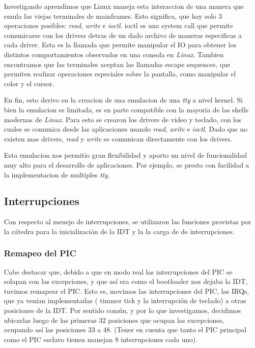 \documentclass[a4paper,10pt]{article}
\begin{document}
    Investigando aprendimos que Linux maneja esta interaccion de una manera que emula las viejas terminales de mainframes.
    Esto significa, que hay solo 3 operaciones posibles: \textit{read}, \textit{write} e \textit{ioctl}.
    ioctl es una system call que permite comunicarse con los drivers detras de un dado archivo de maneras especificas a cada driver.
    Esta es la llamada que permite manipular el IO para obtener los distintos comportamientos observados en una consola en \textit{Linux}.
    Tambien encontramos que las terminales aceptan las llamadas escape sequences, que permiten realizar operaciones especiales sobre la pantalla, como manipular el color y el cursor.

    En fin, esto derivo en la creacion de una emulacion de una \textit{tty} a nivel kernel.
    Si bien la emulacion es limitada, es en parte compatible con la mayoria de las shells modernas de \textit{Linux}.
    Para esto se crearon los drivers de video y teclado, con los cuales se comunica desde las aplicaciones usando \textit{read}, \textit{write} e \textit{ioctl}.
    Dado que no existen mas drivers, \textit{read} y \textit{write} se comunican directamente con los drivers.

    Esta emulacion nos permitio gran flexibilidad y aporto un nivel de funcionalidad muy alto para el desarrollo de aplicaciones.
    Por ejemplo, se presto con facilidad a la implementacion de multiples \textit{tty}.

    \subsection{Interrupciones}
        Con respecto al menejo de interrupciones, se utilizaron las funciones provistas por la cátedra para la inicialización de la IDT y la
        la carga de de interrupciones.

        \subsubsection{Remapeo del PIC}
            Cabe destacar que, debido a que en modo real las interrupciones del PIC se solapan con las excepciones, y que así era como el bootloader
            nos dejaba la IDT, tuvimos remapear el PIC. Esto es, movimos las interrupciones del PIC, las IRQs, que ya venían implementadas 
            ( timmer tick y la interrupción de teclado) a otras posiciones de la IDT. Por sentido común, y por lo que investigamos, decidimos
            ubicarlas luego de las primeras 32 posiciones que ocupan las excepciones, ocupando así las posiciones 33 a 48. (Tener en cuenta
            que tanto el PIC principal como el PIC esclavo tienen manejan 8 interrupciones cada uno).
        
\end{document}
